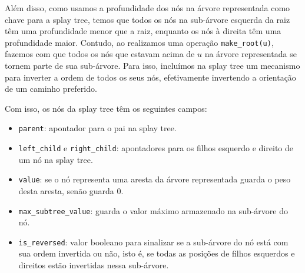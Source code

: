 Além disso, como usamos a profundidade dos nós na árvore representada como chave para a splay tree, temos que todos os nós na sub-árvore esquerda da raiz têm uma profundidade menor que a raiz, enquanto os nós à direita têm uma profundidade maior. Contudo, ao realizamos uma operação \texttt{make\_root(u)}, fazemos com que todos os nós que estavam acima de $u$ na árvore representada se tornem parte de sua sub-árvore. Para isso, incluímos na splay tree um mecanismo para inverter a ordem de todos os seus nós, efetivamente invertendo a orientação de um caminho preferido.

Com isso, os nós da splay tree têm os seguintes campos:

\begin{itemize}
    \item \texttt{parent}: apontador para o pai na splay tree.
    \item \texttt{left\_child} e \texttt{right\_child}: apontadores para os filhos esquerdo e direito de um nó na splay tree.
    \item \texttt{value}: se o nó representa uma aresta da árvore representada guarda o peso desta aresta, senão guarda 0.
    \item \texttt{max\_subtree\_value}: guarda o valor máximo armazenado na sub-árvore do nó.
    \item \texttt{is\_reversed}: valor booleano para sinalizar se a sub-árvore do nó está com sua ordem invertida ou não, isto é, se todas as posições de filhos esquerdos e direitos estão  invertidas nessa  sub-árvore.
\end{itemize}


